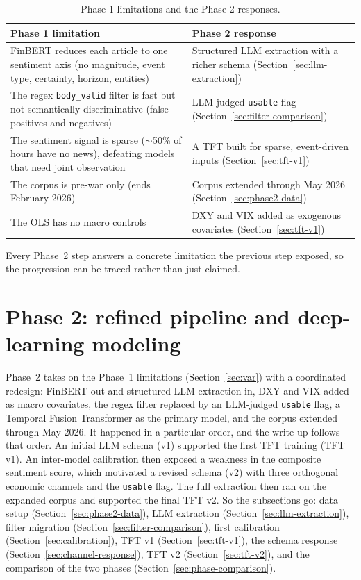 \begin{table}[h]
  \centering
  \caption{Phase 1 limitations and the Phase 2 responses.}
  \label{tab:phase1-limitations}
  \begin{tabular}{@{}p{7cm}p{6.5cm}@{}}
    \toprule
    Phase 1 limitation & Phase 2 response \\
    \midrule
    FinBERT reduces each article to one sentiment axis (no magnitude, event type, certainty, horizon, entities) & Structured LLM extraction with a richer schema (Section~\ref{sec:llm-extraction}) \\
    The regex \texttt{body\_valid} filter is fast but not semantically discriminative (false positives and negatives) & LLM-judged \texttt{usable} flag (Section~\ref{sec:filter-comparison}) \\
    The sentiment signal is sparse ($\sim$50\% of hours have no news), defeating models that need joint observation & A TFT built for sparse, event-driven inputs (Section~\ref{sec:tft-v1}) \\
    The corpus is pre-war only (ends February 2026) & Corpus extended through May 2026 (Section~\ref{sec:phase2-data}) \\
    The OLS has no macro controls & DXY and VIX added as exogenous covariates (Section~\ref{sec:tft-v1}) \\
    \bottomrule
  \end{tabular}
\end{table}

Every Phase~2 step answers a concrete limitation the previous step exposed, so the progression can be traced rather than just claimed.

\section{Phase 2: refined pipeline and deep-learning modeling}\label{sec:phase2}

Phase~2 takes on the Phase~1 limitations (Section~\ref{sec:var}) with a coordinated redesign: FinBERT out and structured LLM extraction in, DXY and VIX added as macro covariates, the regex filter replaced by an LLM-judged \texttt{usable} flag, a Temporal Fusion Transformer as the primary model, and the corpus extended through May 2026. It happened in a particular order, and the write-up follows that order. An initial LLM schema (v1) supported the first TFT training (TFT v1). An inter-model calibration then exposed a weakness in the composite sentiment score, which motivated a revised schema (v2) with three orthogonal economic channels and the \texttt{usable} flag. The full extraction then ran on the expanded corpus and supported the final TFT v2. So the subsections go: data setup (Section~\ref{sec:phase2-data}), LLM extraction (Section~\ref{sec:llm-extraction}), filter migration (Section~\ref{sec:filter-comparison}), first calibration (Section~\ref{sec:calibration}), TFT v1 (Section~\ref{sec:tft-v1}), the schema response (Section~\ref{sec:channel-response}), TFT v2 (Section~\ref{sec:tft-v2}), and the comparison of the two phases (Section~\ref{sec:phase-comparison}).

